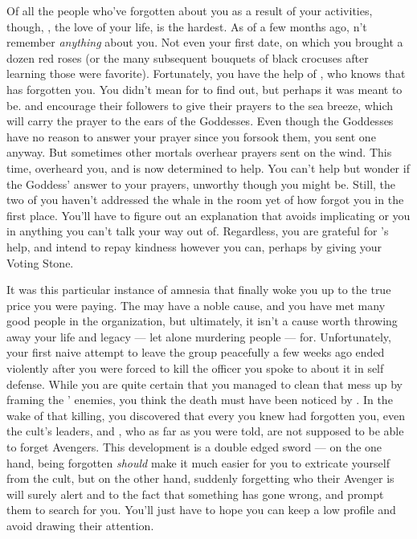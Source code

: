 \documentclass[char]{GL2020}
\begin{document}
Of all the people who've forgotten about you as a result of your activities, though, \cHeadScientist{}, the love of your life, is the hardest. As of a few months ago, \cHeadScientist{\theydo}n't remember \emph{anything} about you. Not even your first date, on which you brought \cHeadScientist{\them} a dozen red roses (or the many subsequent bouquets of black crocuses after learning those were \cHeadScientist{\their} favorite). Fortunately, you have the help of \cInitiate{}, who knows that \cHeadScientist{} has forgotten you. You didn't mean for \cInitiate{} to find out, but perhaps it was meant to be. \cEbb{} and \cFlow{} encourage their followers to give their prayers to the sea breeze, which will carry the prayer to the ears of the Goddesses. Even though the Goddesses have no reason to answer your prayer since you forsook them, you sent one anyway. But sometimes other mortals overhear prayers sent on the wind. This time, \cInitiate{} overheard you, and is now determined to help. You can't help but wonder if \cInitiate{\theyare} the Goddess' answer to your prayers, unworthy though you might be. Still, the two of you haven't addressed the whale in the room yet of how \cHeadScientist{} forgot you in the first place. You'll have to figure out an explanation that avoids implicating \cHeadScientist{} or you in anything you can't talk your way out of. Regardless, you are grateful for \cInitiate{}'s help, and intend to repay \cInitiate{\their} kindness however you can, perhaps by giving \cInitiate{\them} your Voting Stone.

It was this particular instance of amnesia that finally woke you up to the true price you were paying. The \pGoaties{} may have a noble cause, and you have met many good people in the organization, but ultimately, it isn't a cause worth throwing away your life and legacy — let alone murdering people — for. Unfortunately, your first naive attempt to leave the group peacefully a few weeks ago ended violently after you were forced to kill the officer you spoke to about it in self defense. While you are quite certain that you managed to clean that mess up by framing the \pGoaties{}’ enemies, you think the death must have been noticed by \cGenesis{} \cGenesis{\themself}. In the wake of that killing, you discovered that every \pGoatie{} you knew had forgotten you, even the cult’s leaders, \cChupSecond{\full} and \cChupLeader{\full}, who as far as you were told, are not supposed to be able to forget Avengers. This development is a double edged sword — on the one hand, being forgotten \emph{should} make it much easier for you to extricate yourself from the cult, but on the other hand, suddenly forgetting who their Avenger is will surely alert \cChupSecond{} and \cChupLeader{} to the fact that something has gone wrong, and prompt them to search for you. You’ll just have to hope you can keep a low profile and avoid drawing their attention.
\end{document}
